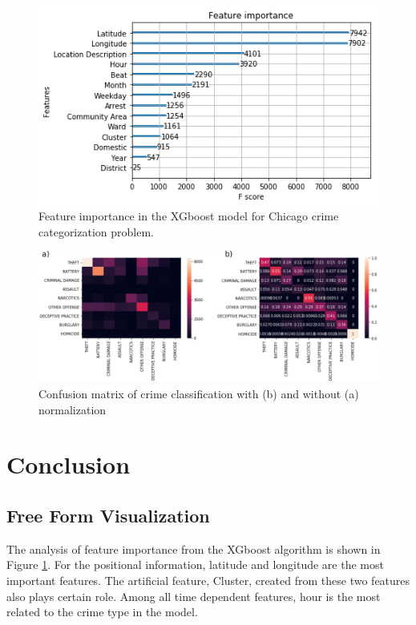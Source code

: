 \documentclass[12pt]{article}
\begin{document}
\begin{figure}[ht]
\includegraphics[scale=0.8]{figure/feature_importance.png}
\centering
\caption{Feature importance in the XGboost model for Chicago crime categorization problem.}
\label{fig:xgboost}
\end{figure}

\begin{figure}[ht]
\includegraphics[scale=0.4]{figure/confusion_matrix.eps}
\centering
\caption{Confusion matrix of crime classification with (b) and without (a) normalization}
\label{fig:confusion_matrix}
\end{figure}

\section{Conclusion}
\subsection{Free Form Visualization}
The analysis of feature importance from the XGboost algorithm is shown in Figure \ref{fig:xgboost}. For the positional information, latitude and longitude are the most important features. The artificial feature, Cluster, created from these two features also plays certain role. Among all time dependent features, hour is the most related to the crime type in the model. 
\end{document}
